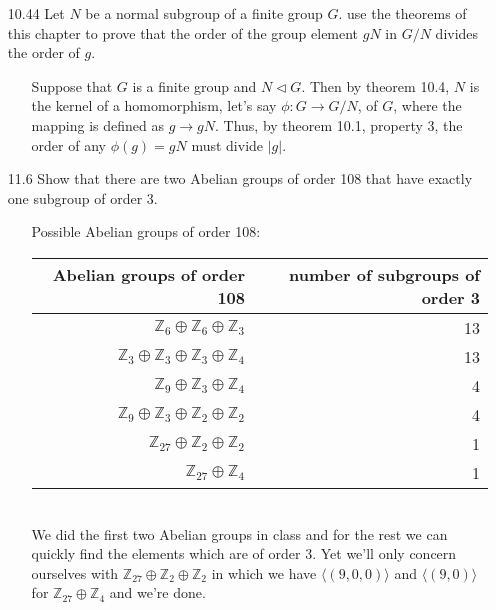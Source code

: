 \documentclass[12pt]{article}
\begin{document}
\begin{enumerate}
\item[10.44] Let $N$ be a normal subgroup of a finite group $G$. use the theorems of
this chapter to prove that the order of the group element $gN$ in $G/N$ divides the order
of $g$.
\begin{enumerate}
\item[] Suppose that $G$ is a finite group and $N \lhd G$. Then by theorem 10.4, $N$ is 
the kernel of a homomorphism, let's say $\phi: G \rightarrow G/N$, of $G$, where the mapping 
is defined as $g \rightarrow gN$. Thus, by theorem 10.1, property 3, the order of any
$\phi(g) = gN$ must divide $|g|$.
\end{enumerate}

\item[11.6] Show that there are two Abelian groups of order 108 that have exactly one
subgroup of order 3.
\begin{enumerate}
\item[] Possible Abelian groups of order 108: \\
\begin{tabular}{|r|r|}
\hline
Abelian groups of order 108 & number of subgroups of order 3 \\
\hline
$\mathbb{Z}_6 \oplus \mathbb{Z}_6 \oplus \mathbb{Z}_3$ & 13 \\
$\mathbb{Z}_3 \oplus \mathbb{Z}_3 \oplus \mathbb{Z}_3 \oplus \mathbb{Z}_4$ & 13 \\
$\mathbb{Z}_9 \oplus \mathbb{Z}_3 \oplus \mathbb{Z}_4$ & 4 \\
$\mathbb{Z}_9 \oplus \mathbb{Z}_3 \oplus \mathbb{Z}_2 \oplus \mathbb{Z}_2$ & 4 \\
$\mathbb{Z}_{27} \oplus \mathbb{Z}_2 \oplus \mathbb{Z}_2$ & 1 \\
$\mathbb{Z}_{27} \oplus \mathbb{Z}_4$ & 1 \\
\hline
\end{tabular} \\
We did the first two Abelian groups in class and for the rest we can quickly find the elements which are of order 3. 
Yet we'll only concern ourselves with $\mathbb{Z}_{27} \oplus \mathbb{Z}_2 \oplus \mathbb{Z}_2$ in which 
we have $\langle (9, 0, 0)\rangle$ and $\langle (9, 0)\rangle$ for $\mathbb{Z}_{27} \oplus \mathbb{Z}_4$ and we're done.
\end{enumerate}


\end{enumerate}
\end{document}
